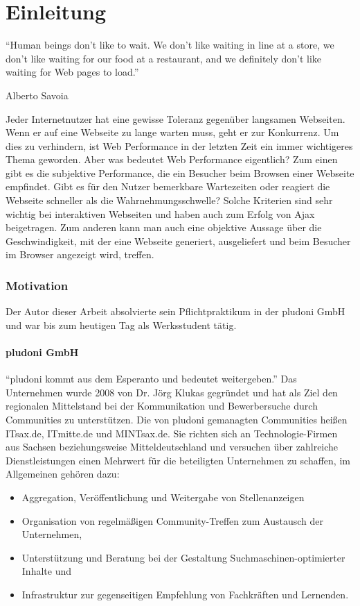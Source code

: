 \part{Einleitung}
\epigraph{``Human beings don’t like to wait. We don’t like waiting in line at a store, we don’t like waiting for our food at a restaurant, and we definitely don’t like waiting for Web pages to load.''}{Alberto Savoia}

Jeder Internetnutzer hat eine gewisse Toleranz gegenüber langsamen Webseiten. Wenn er auf eine Webseite zu lange warten muss, geht er zur Konkurrenz. Um dies zu verhindern, ist Web Performance in der letzten Zeit ein immer wichtigeres Thema geworden. Aber was bedeutet Web Performance eigentlich? Zum einen gibt es die subjektive Performance, die ein Besucher beim Browsen einer Webseite empfindet. Gibt es für den Nutzer bemerkbare Wartezeiten oder reagiert die Webseite schneller als die Wahrnehmungsschwelle? Solche Kriterien sind sehr wichtig bei interaktiven Webseiten und haben auch zum Erfolg von Ajax beigetragen. Zum anderen kann man auch eine objektive Aussage über die Geschwindigkeit, mit der eine Webseite generiert, ausgeliefert und beim Besucher im Browser angezeigt wird, treffen. 
\label{sec:intro}
\section{Motivation}

Der Autor dieser Arbeit absolvierte sein Pflichtpraktikum in der pludoni GmbH und war bis zum heutigen Tag als Werksstudent tätig.
\subsection{pludoni GmbH}
“pludoni kommt aus dem Esperanto und bedeutet weitergeben.” Das Unternehmen wurde 2008 von Dr. Jörg Klukas gegründet und hat als Ziel den regionalen Mittelstand bei der Kommunikation und Bewerbersuche durch Communities zu unterstützen. Die von pludoni gemanagten Communities heißen ITsax.de, ITmitte.de und MINTsax.de. Sie richten sich an Technologie-Firmen aus Sachsen beziehungsweise Mitteldeutschland und versuchen über zahlreiche Dienstleistungen einen Mehrwert für die beteiligten Unternehmen zu schaffen, im Allgemeinen gehören dazu:

\begin{itemize}
 \item Aggregation, Veröffentlichung und Weitergabe von Stellenanzeigen
 \item Organisation von regelmäßigen Community-Treffen zum Austausch der Unternehmen,
 \item Unterstützung und Beratung bei der Gestaltung Suchmaschinen-optimierter Inhalte und
 \item Infrastruktur zur gegenseitigen Empfehlung von Fachkräften und Lernenden.
\end{itemize}

